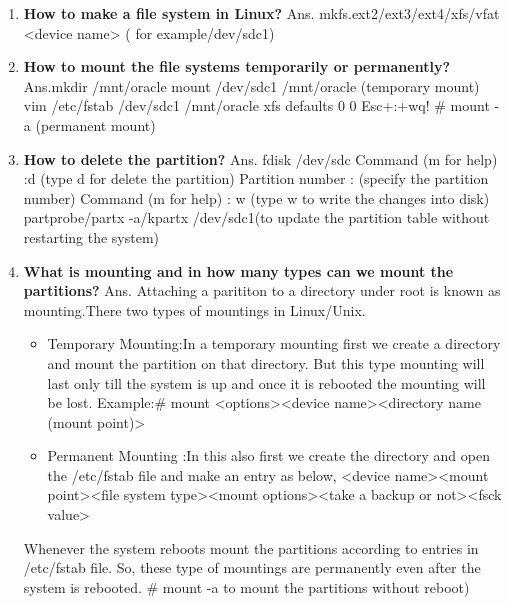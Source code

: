 \begin{enumerate}
\begin{enumerate}
  \bigskip
  \bigskip

  \item \textbf{How to make a file system in Linux?}
  \newline
  Ans. mkfs.ext2/ext3/ext4/xfs/vfat	<device name> ( for example/dev/sdc1)

  \bigskip
  \bigskip

  \item \textbf{How to mount the file systems temporarily or permanently?}
  \newline
  Ans.mkdir /mnt/oracle	
      mount /dev/sdc1  /mnt/oracle   (temporary mount)
      vim /etc/fstab
          /dev/sdc1		/mnt/oracle 	       xfs		defaults	0	0
	Esc+:+wq!
	# mount   -a  (permanent mount)

  \bigskip
  \bigskip

  \item \textbf{How to delete the partition?}
  \newline
  Ans. fdisk  /dev/sdc
  Command (m for help) :d          (type   d   for delete the partition)
  Partition number :  (specify the partition number)
  Command (m for help) : w      (type   w   to write the changes into disk)
  partprobe/partx  -a/kpartx   /dev/sdc1(to update the partition table without restarting the system)

  \bigskip
  \bigskip

  \item \textbf{What is mounting and in how many types can we mount the partitions?}
  \newline
  Ans. Attaching a parititon to a directory under root is known as mounting.There two types of mountings in Linux/Unix.
   \begin{itemize}
     \item Temporary Mounting:In a temporary mounting first we create a directory and mount the partition on that directory. But this type mounting will last only till the system is up and once it is rebooted the mounting will be lost.
      Example:# mount   <options><device name><directory name (mount point)>
     \item Permanent Mounting :In this also first we create the directory and open the /etc/fstab file and make an entry as below,
    <device name><mount point><file system type><mount options><take a backup or not><fsck value>
   \end{itemize} 
    Whenever the system  reboots mount the partitions according to entries in /etc/fstab file. So, these type of mountings are permanently even after the system is rebooted.
    # mount   -a          to mount the partitions without reboot)


\end{enumerate}
\end{enumerate}
